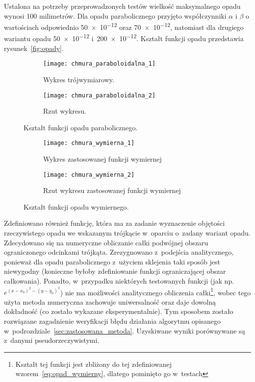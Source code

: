 Ustalona na potrzeby przeprowadzonych testów wielkość maksymalnego opadu wynosi 100 milimetrów. Dla opadu parabolicznego przyjęto współczynniki $\alpha$ i $\beta$ o wartościach odpowiednio \num{50e-12} oraz \num{70e-12}, natomiast dla drugiego wariantu opadu \num{50e-12} i~\num{200e-12}. Kształt funkcji opadu przedstawia rysunek~\ref{fig:opady}.

\begin{figure}[!ht]
\centering
	\begin{subfigure}{1\textwidth}
		\centering
		\texttt{[image: chmura\_paraboloidalna\_1]}
		\caption{Wykres trójwymiarowy.}
		\label{fig:parabola_3d}
	\end{subfigure}	
	\begin{subfigure}{1\textwidth}
		\centering
		\texttt{[image: chmura\_paraboloidalna\_2]}
		\caption{Rzut wykresu.}
		\label{fig:parabola_2d}
	\end{subfigure}	

\label{fig:opad_paraboliczny}
\caption{Kształt funkcji opadu parabolicznego.}
\end{figure}

\begin{figure}[!ht]
	\label{fig:opad_wymierny}
	\begin{subfigure}{0.5\textwidth}
		\centering
		\texttt{[image: chmura\_wymierna\_1]}
		\caption{Wykres zastosowanej funkcji wymiernej}
		\label{fig:wymierna_3d}
	\end{subfigure}	
	\begin{subfigure}{0.5\textwidth}
		\centering
		\texttt{[image: chmura\_wymierna\_2]}
		\caption{Rzut wykresu zastosowanej funkcji wymiernej}
		\label{fig:wymierna_2d}
	\end{subfigure}	
	\caption{Kształt funkcji opadu wymiernego.}
\end{figure}

Zdefiniowano również funkcję, która ma za zadanie wyznaczenie objętości rzeczywistego opadu we wskazanym trójkącie w~oparciu o~zadany wariant opadu. Zdecydowano się na numeryczne obliczanie całki podwójnej obszaru ograniczonego odcinkami trójkąta. Zrezygnowano z~podejścia analitycznego, ponieważ dla opadu parabolicznego z~użyciem sklejenia taki sposób jest niewygodny (konieczne byłoby zdefiniowanie funkcji ograniczającej obszar całkowania). Ponadto, w~przypadku niektórych testowanych funkcji (jak np. $e^{(x-x_0)^2 - (y-y_0)^2}$) nie ma możliwości analitycznego obliczenia całki\footnote{Kształt tej funkcji jest zbliżony do tej zdefiniowanej wzorem~\ref{eq:opad_wymierny}, dlatego pominięto go w~testach}, wobec tego użyta metoda numeryczna zachowuje uniwersalność oraz daje dowolną dokładność (co zostało wykazane eksperymentalnie). Tym sposobem zostało rozwiązane zagadnienie weryfikacji błędu działania algorytmu opisanego w~podrozdziale~\ref{sec:zastosowana_metoda}. Uzyskiwane wyniki porównywane są z~danymi pseudorzeczywistymi.



